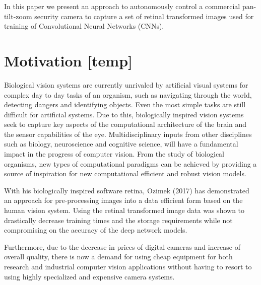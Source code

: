 \documentclass{l4proj}
\begin{document}
In this paper we present an approach to autonomously control a commercial pan-tilt-zoom security camera to capture a set of retinal transformed images used for training of Convolutional Neural Networks (CNNs).


 
 



\section{Motivation [temp]}

 Biological vision systems are currently unrivaled by artificial visual systems for complex day to day tasks of an organism, such as navigating through the world, detecting dangers and identifying objects. Even the most simple tasks are still difficult for artificial systems. Due to this, biologically inspired vision systems seek to capture key aspects of the computational architecture of the brain and the sensor capabilities of the eye. Multidisciplinary inputs from other disciplines such as biology, neuroscience and cognitive science, will have a fundamental impact in the progress of computer vision. From the study of biological organisms, new types of computational paradigms can be achieved by providing a source of inspiration for new computational efficient and robust vision models.
 
 With his biologically inspired software retina, Ozimek (2017) has demonstrated an approach for pre-processing images into a data efficient form based on the human vision system. Using the retinal transformed image data was shown to drastically decrease training times and the storage requirements while not compromising on the accuracy of the deep network models.
 
 Furthermore, due to the decrease in prices of digital cameras and increase of overall quality, there is now a demand for using cheap equipment for both research and industrial computer vision applications without having to resort to using highly specialized and expensive camera systems.
 
\end{document}
